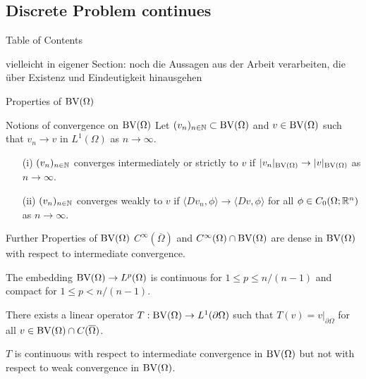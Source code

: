 \subsection{Discrete Problem continues}
\begin{frame}[noframenumbering]{Table of Contents}
\end{frame}

\begin{frame}
  vielleicht in eigener Section: noch die Aussagen aus der Arbeit verarbeiten,
  die über Existenz und Eindeutigkeit hinausgehen
\end{frame}


\begin{frame}
\end{frame}

\begin{frame}{Properties of $\textup{BV}(\Omega)$}
\end{frame}

\begin{frame}{Notions of convergence on $\textup{BV}(\Omega)$}
  Let $(v_n)_{n\in\mathbb{N}}\subset \textup{BV}(\Omega)$ and $v\in \textup{BV}(\Omega)$ such that
  $v_n\rightarrow v$ in $L^1(\Omega)$ as $n\rightarrow\infty$.
  \pause
  \begin{itemize}
    \item[(i)]
      $(v_n)_{n\in\mathbb{N}}$ converges intermediately or strictly to $v$
      if $|v_n|_{\textup{BV}(\Omega)}\rightarrow |v|_{\textup{BV}(\Omega)}$ as
      $n\rightarrow\infty$.
      \pause
    \item[(ii)] $(v_n)_{n\in\mathbb{N}}$ converges weakly to
      $v$ if
      $\langle Dv_n,\phi\rangle\rightarrow \langle Dv,\phi\rangle$ 
      for all $\phi\in C_0(\Omega;\mathbb{R}^n)$ as 
      $n\rightarrow\infty$.
  \end{itemize}
\end{frame}

\begin{frame}{Further Properties of $\textup{BV}(\Omega)$}
  $C^\infty(\overline\Omega)$ and $C^\infty(\Omega)\cap\textup{BV}(\Omega)$ are dense
  in $\textup{BV}(\Omega)$ with respect to intermediate convergence.
  
  \pause
  \bigskip

  The embedding $\textup{BV}(\Omega)\to L^p(\Omega)$ is continuous for
  $1\leq p\leq n/(n-1)$ and compact for $1\leq p< n/(n-1)$.
  
  \pause
  \bigskip

  There exists a linear operator $T:\textup{BV}(\Omega)\to L^1(\partial\Omega)$
  such that $T(v) = v|_{\partial\Omega}$ for all $v\in\textup{BV}(\Omega)\cap
  C(\overline\Omega)$.

  $T$ is continuous with respect to intermediate convergence in $\textup{BV}(\Omega)$
  but not with respect to weak convergence in $\textup{BV}(\Omega)$. 
\end{frame}

